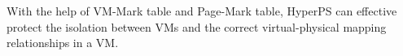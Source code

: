 \begin{table}[]
    \caption{Page-Mark Structure}
    \label{tb:pagemark}
\end{table}






With the help of VM-Mark table and Page-Mark table, HyperPS can effective protect the isolation between VMs and the correct virtual-physical mapping relationships in a VM. 


















